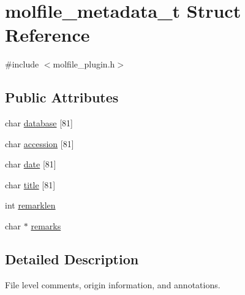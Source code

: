 \hypertarget{structmolfile__metadata__t}{\section{molfile\-\_\-metadata\-\_\-t \-Struct \-Reference}
\label{structmolfile__metadata__t}
}


{\ttfamily \#include $<$molfile\-\_\-plugin.\-h$>$}

\subsection*{\-Public \-Attributes}
\begin{DoxyCompactItemize}
\item 
char \hyperlink{structmolfile__metadata__t_a385ecca8cfa3928877d74d31ad1cc05a}{database} \mbox{[}81\mbox{]}
\item 
char \hyperlink{structmolfile__metadata__t_ae99a07985c93d299ed8383d3ef6fa9e7}{accession} \mbox{[}81\mbox{]}
\item 
char \hyperlink{structmolfile__metadata__t_afe87427566f4e13bf772e204ec52cc23}{date} \mbox{[}81\mbox{]}
\item 
char \hyperlink{structmolfile__metadata__t_afcb3abfef611009ec3fce80ff105c0d4}{title} \mbox{[}81\mbox{]}
\item 
int \hyperlink{structmolfile__metadata__t_a8ff113f605527c9710f53b82a991e05c}{remarklen}
\item 
char $\ast$ \hyperlink{structmolfile__metadata__t_a09c612c267d537205b032e45ead23b33}{remarks}
\end{DoxyCompactItemize}


\subsection{\-Detailed \-Description}
\-File level comments, origin information, and annotations. 

